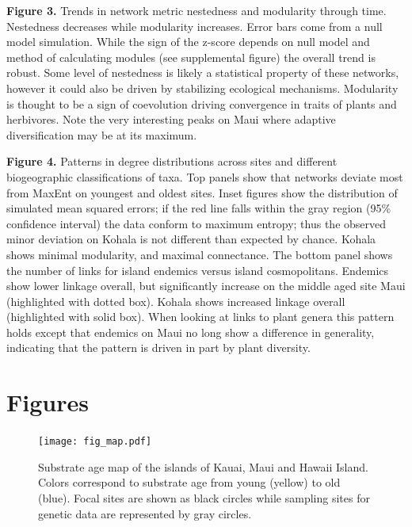 \documentclass[12pt]{article}
\begin{document}
\begin{linenumbers}
\vspace{2em}
\noindent
{\bf Figure 3.} Trends in network metric nestedness and modularity
through time. Nestedness decreases while modularity increases. Error
bars come from a null model simulation. While the sign of the z-score
depends on null model and method of calculating modules (see
supplemental figure) the overall trend is robust. Some level of
nestedness is likely a statistical property of these networks, however
it could also be driven by stabilizing ecological
mechanisms. Modularity is thought to be a sign of coevolution driving
convergence in traits of plants and herbivores. Note the very
interesting peaks on Maui where adaptive diversification may be at its
maximum.

\vspace{2em}
\noindent
{\bf Figure 4.} Patterns in degree distributions across sites and
different biogeographic classifications of taxa. Top panels show that
networks deviate most from MaxEnt on youngest and oldest sites. Inset
figures show the distribution of simulated mean squared errors; if the
red line falls within the gray region (95\% confidence interval) the
data conform to maximum entropy; thus the observed minor deviation on
Kohala is not different than expected by chance. Kohala shows minimal
modularity, and maximal connectance. The bottom panel shows the number
of links for island endemics versus island cosmopolitans. Endemics
show lower linkage overall, but significantly increase on the middle
aged site Maui (highlighted with dotted box). Kohala shows increased
linkage overall (highlighted with solid box). When looking at links to
plant genera this pattern holds except that endemics on Maui no long
show a difference in generality, indicating that the pattern is driven
in part by plant diversity.

\clearpage

\section*{Figures}

\begin{figure}[!htb]
  \centering
  \texttt{[image: fig\_map.pdf]} 
  \caption{Substrate age map of the islands of Kauai, Maui and Hawaii
    Island. Colors correspond to substrate age from young (yellow) to
    old (blue). Focal sites are shown as black circles while sampling
    sites for genetic data are represented by gray circles.}
  \label{fig:map}
\end{figure}


\end{linenumbers}
\end{document}
